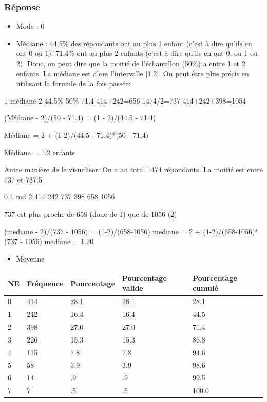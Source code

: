 \documentclass[
]{article}
\providecommand{\tightlist}{%
  \setlength{\itemsep}{0pt}\setlength{\parskip}{0pt}}
\begin{document}
\hypertarget{ruxe9ponse}{%
\subsubsection{Réponse}\label{ruxe9ponse}}

\begin{itemize}
\item
  Mode : 0
\item
  Médiane : 44,5\% des répondants ont au plus 1 enfant (c'est à dire
  qu'ils en ont 0 ou 1). 71,4\% ont au plus 2 enfants (c'est à dire
  qu'ils en ont 0, ou 1 ou 2). Donc, on peut dire que la moitié de
  l'échantillon (50\%) a entre 1 et 2 enfants. La médiane est alors
  l'intervalle {[}1,2{]}. On peut être plus précis en utilisant la
  formule de la fois passée:
\end{itemize}

1 médiane 2 44.5\% 50\% 71.4 414+242=656 1474/2=737 414+242+398=1054

(Médiane - 2)/(50 - 71.4) = (1 - 2)/(44.5 - 71.4)

Médiane = 2 + (1-2)/(44.5 - 71.4)*(50 - 71.4)

Médiane = 1.2 enfants

Autre manière de le visualiser: On a au total 1474 répondants. La moitié
est entre 737 et 737.5

0 1 md 2 414 242 737 398 658 1056

737 est plus proche de 658 (donc de 1) que de 1056 (2)

(mediane - 2)/(737 - 1056) = (1-2)/(658-1056) mediane = 2 +
(1-2)/(658-1056)*(737 - 1056) mediane = 1.20

\begin{itemize}
\tightlist
\item
  Moyenne
\end{itemize}

\begin{longtable}[]{@{}lllll@{}}
\toprule()
NE & Fréquence & Pourcentage & Pourcentage valide & Pourcentage
cumulé \\
\midrule()
\endhead
0 & 414 & 28.1 & 28.1 & 28.1 \\
1 & 242 & 16.4 & 16.4 & 44.5 \\
2 & 398 & 27.0 & 27.0 & 71.4 \\
3 & 226 & 15.3 & 15.3 & 86.8 \\
4 & 115 & 7.8 & 7.8 & 94.6 \\
5 & 58 & 3.9 & 3.9 & 98.6 \\
6 & 14 & .9 & .9 & 99.5 \\
7 & 7 & .5 & .5 & 100.0 \\
\bottomrule()
\end{longtable}
\end{document}
